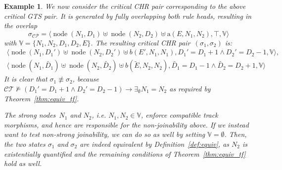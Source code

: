 \documentclass{tlp}
\newtheorem{example}{Example}[section]
\newcommand{\st}[3]{\ensuremath{\langle #1 , #2 , #3 \rangle}}
\newcommand{\CT}{\ensuremath{\mathcal{CT}}}
\newcommand{\mcCP}{\ensuremath{\mathcal{CP}}}
\newcommand{\bbV}{\ensuremath{\mathbb{V}}}
\newcommand{\sigcp}{\ensuremath{\sigma_{\mcCP}}}
\DeclareMathOperator{\node}{node}
\begin{document}
\begin{example}
We now consider the critical CHR pair corresponding to the above critical GTS
pair. It is generated by fully overlapping both rule heads, resulting in the
overlap \[\sigcp = \st{\node(N_1, D_1)\uplus\node(N_2, D_2)\uplus\text{a}(E,
N_1, N_2)}{\top}{\bbV}\] with $\bbV = \{N_1, N_2, D_1, D_2, E\}$. The resulting
critical CHR pair~$(\sigma_1, \sigma_2)$ is:
\begin{eqnarray*} 
\st{\node(N_1,D_1') \uplus \node(N_2, D_2') \uplus b(E', N_1,
N_1)}{D_1' = D_1{+}1 \land D_2' = D_2{-}1}{\bbV},\\
\st{\node(N_1,\tilde{D_1}) \uplus \node(N_2, \tilde{D_2}) \uplus
b(\tilde{E}, N_2, N_2)}{\tilde{D_1} = D_1{-}1 \land \tilde{D_2} =
D_2{+}1}{\bbV}
\end{eqnarray*}
It is clear that $\sigma_1 \not \equiv \sigma_2$, because $\CT \not \models (D_1' =
D_1{+}1 \land D_2' = D_2{-}1) \rightarrow \exists_\emptyset N_1 = N_2$ as
required by Theorem~\ref{thm:equiv_tf}.

The strong nodes~$N_1$ and $N_2$, i.e. $N_1,N_2 \in \bbV$, enforce compatible
track morphisms, and hence are responsible for the non-joinability above. If we
instead want to test non-strong joinability, we can do so as well by setting
$\bbV = \emptyset$. Then, the two states $\sigma_1$ and $\sigma_2$ are indeed
equivalent by Definition~\ref{def:equiv}, as $N_2$ is existentially quantified
and the remaining conditions of Theorem~\ref{thm:equiv_tf} hold as well.
\end{example}
\end{document}
